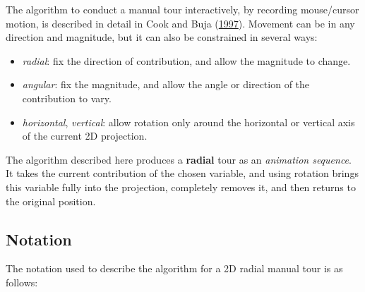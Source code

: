 The algorithm to conduct a manual tour interactively, by recording
mouse/cursor motion, is described in detail in Cook and Buja
(\protect\hyperlink{ref-cook_manual_1997}{1997}). Movement can be in any
direction and magnitude, but it can also be constrained in several ways:

\begin{itemize}
\tightlist
\item
  \emph{radial}: fix the direction of contribution, and allow the
  magnitude to change.
\item
  \emph{angular}: fix the magnitude, and allow the angle or direction of
  the contribution to vary.
\item
  \emph{horizontal}, \emph{vertical}: allow rotation only around the
  horizontal or vertical axis of the current 2D projection.
\end{itemize}

The algorithm described here produces a \textbf{radial} tour as an
\emph{animation sequence}. It takes the current contribution of the
chosen variable, and using rotation brings this variable fully into the
projection, completely removes it, and then returns to the original
position.

\hypertarget{notation}{%
\subsection{Notation}\label{notation}}

The notation used to describe the algorithm for a 2D radial manual tour
is as follows:

